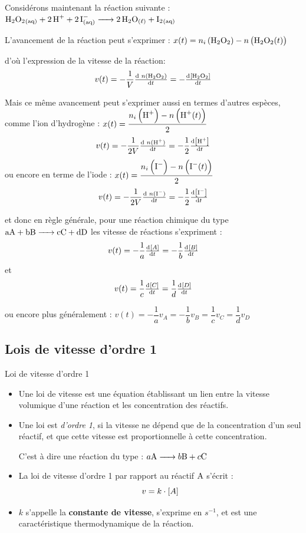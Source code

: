 \documentclass[11pt,a4paper]{article}
\begin{document}
Considérons maintenant la réaction suivante :  $ \ce{H2O2_{(aq)}} + \ce{2H+ + 2I^-_{(aq)} -> 2H2O_{(\ell)} + I2_{(aq)}} $

L'avancement de la réaction peut s'exprimer : $x(t) = n_i\left(\ce{H2O2}\right) - n\left(\ce{H2O2}(t)\right)$

d'où l'expression de la vitesse de la réaction: 
\[ v(t) = -\frac{1}{V}\od{\;n(\ce{H2O2})}{t} =-\od{\conc{\ce{H2O2}}}{t}
\]

Mais ce même avancement peut s'exprimer aussi en termes d'autres espèces, comme l'ion d'hydrogène : $x(t) = \dfrac{n_i\left(\ce{H+}\right) - n\left(\ce{H+}(t)\right)}{2}$ 
\[ v(t) = -\frac{1}{2V}\od{\;n(\ce{H+})}{t} =-\dfrac{1}{2}\od{\conc{\ce{H+}}}{t}
\]
ou encore en terme de l'iode :  $x(t) = \dfrac{n_i\left(\ce{I-}\right) - n\left(\ce{I-}(t)\right)}{2}$ 
\[ v(t) = -\frac{1}{2V}\od{\;n(\ce{I-})}{t} =-\dfrac{1}{2}\od{\conc{\ce{I-}}}{t}
\]

et donc en règle générale, pour une réaction chimique du type $ \ce{aA + bB -> cC + dD}  $ les vitesse de réactions s'expriment : 
\[ v(t) = -\dfrac{1}{a}\od{\conc{A}}{t} = -\dfrac{1}{b}\od{\conc{B}}{t}    \] et 
\[ v(t) = \dfrac{1}{c}\od{\conc{C}}{t} = \dfrac{1}{d}\od{\conc{D}}{t}    \] 

ou encore plus généralement : $v(t) = -\dfrac{1}{a}v_A = -\dfrac{1}{b}v_B = \dfrac{1}{c}v_C = \dfrac{1}{d}v_D $

\subsection{Lois de vitesse d'ordre 1}

\begin{defn}{Loi de vitesse d'ordre 1}
\begin{itemize}
    \item Une loi de vitesse est une équation établissant un lien entre la vitesse volumique d'une réaction et les concentration des réactifs. 
    \item Une loi est \emph{d'ordre 1}, si la vitesse ne dépend que de la concentration d'un seul réactif, et que cette vitesse est proportionnelle à cette concentration. 
    
    C'est à dire une réaction du type : $a\ce{A -> }  b\ce{B} + c\ce{C}$
    \item La loi de vitesse d'ordre 1 par rapport au réactif $\ce{A}$ s'écrit : 
    \[v = k\cdot\left[{A}\right] \]
    \item $k$ s'appelle la \textbf{constante de vitesse}, s'exprime en $s^{-1}$, et est une caractéristique thermodynamique de la réaction. 
\end{itemize}
\end{defn}
\end{document}
